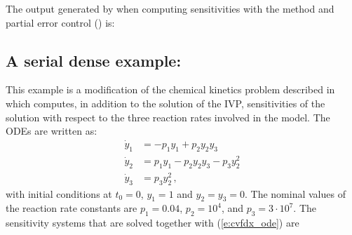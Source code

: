 The output generated by  when computing sensitivities with the 
method and partial error control () is:

\vspace{0.1in}

\subsection{A serial dense example: }
\label{ss:cvfdx}

This example is a modification of the chemical kinetics problem described 
in~\cite{cvode2.2.0_ex} which computes, in addition to the solution of the
IVP, sensitivities of the solution with respect to the three reaction rates 
involved in the model. The ODEs are written as:
\begin{equation}\label{e:cvfdx_ode}
  \begin{split}
    {\dot y}_1 &= -p_1 y_1 + p_2 y_2 y_3   \\
    {\dot y}_2 &=  p_1 y_1 - p_2 y_2 y_3 - p_3 y_2^2 \\
    {\dot y}_3 &=  p_3 y_2^2 \, ,
  \end{split}
\end{equation}
with initial conditions at $t_0 = 0$, $y_1 = 1$ and $y_2 = y_3 = 0$. 
The nominal values of the reaction rate constants are 
$p_1 = 0.04$, $p_2 = 10^4$, and $p_3 = 3\cdot 10^7$.
The sensitivity systems that are solved together with (\ref{e:cvfdx_ode}) are
